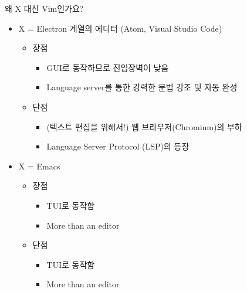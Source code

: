 \documentclass{beamer}
\begin{document}
\begin{frame}{왜 X 대신 Vim인가요?}
  \begin{itemize}
    \item X = Electron 계열의 에디터 (Atom, Visual Studio Code)\pause
      \begin{itemize}
        \item 장점
          \begin{itemize}
            \item GUI로 동작하므로 진입장벽이 낮음\pause
            \item \alert{Language server}를 통한 강력한 문법 강조 및 자동
              완성\pause
          \end{itemize}
        \item 단점
          \begin{itemize}
            \item (텍스트 편집을 위해서!) 웹 브라우저(Chromium)의 부하\pause
            \item \alert{Language Server Protocol (LSP)}의 등장\pause
          \end{itemize}
      \end{itemize}
    \item X = Emacs\pause
      \begin{itemize}
        \item 장점
          \begin{itemize}
            \item TUI로 동작함\pause
            \item More than an editor\pause
          \end{itemize}
        \item 단점\pause
          \begin{itemize}
            \item TUI로 동작함
            \item More than an editor
          \end{itemize}
      \end{itemize}
  \end{itemize}
\end{frame}
\end{document}
